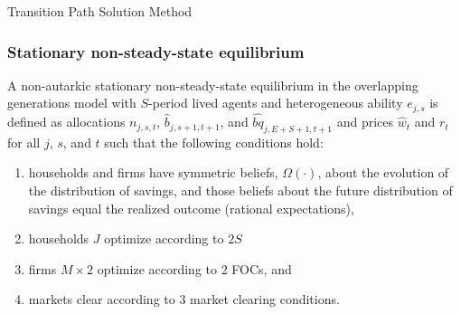 \documentclass{beamer}
\begin{document}


  \begin{frame}{Transition Path Solution Method}\label{TPI Solution}
    \frametitle{Stationary non-steady-state equilibrium}
      \begin{definition}
        A non-autarkic stationary non-steady-state equilibrium in the overlapping generations model with $S$-period lived agents and heterogeneous ability $e_{j,s}$ is defined as allocations $n_{j,s,t}$, $\hat{b}_{j,s+1,t+1}$, and $\hat{bq}_{j,E+S+1,t+1}$ and prices $\hat{w}_t$ and $r_t$ for all $j$, $s$, and $t$ such that the following conditions hold:
        \begin{enumerate}
          \item households and firms have symmetric beliefs, $\Omega(\cdot)$, about the evolution of the distribution of savings, and those beliefs about the future distribution of savings equal the realized outcome (rational expectations),
          \item households $J$ optimize according to $2S$
          \item firms $M\times 2$ optimize according to 2 FOCs, and
          \item markets clear according to 3 market clearing conditions.
        \end{enumerate}
      \end{definition}
  \end{frame}
\end{document}
